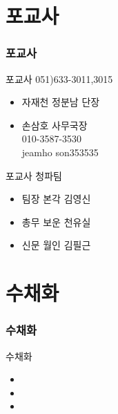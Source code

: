 \documentclass[aspectratio=1610,20pt,xcolor=pdftex,dvipsnames,table,handout]{beamer}
\begin{document}
		\section{포교사}
		\begin{frame} [t,plain]
		\frametitle{포교사}

			\begin{block} {포교사 051)633-3011,3015}
			\setlength{\leftmargini}{1em}			
			\begin{itemize}
				\item 자재천 정분남 단장 	\hrulefill
				\item 손삼호 사무국장 \\ 010-3587-3530 \\ jeamho son353535
			\end{itemize}
			\end{block}						


			\begin{block} {포교사 청파팀 }
			\setlength{\leftmargini}{1em}			
			\begin{itemize}
				\item 팀장 본각 김영신 	\hrulefill
				\item 총무 보운 천유실 	\hrulefill
				\item 신문 월인 김필근 	\hrulefill
			\end{itemize}
			\end{block}						

		\end{frame}					




		\section{수채화}
		\begin{frame} [t,plain]
		\frametitle{수채화}
			\begin{block} {수채화}
			\setlength{\leftmargini}{1em}			
			\begin{itemize}
				\item 	\hrulefill
				\item 	\hrulefill
				\item 	\hrulefill
			\end{itemize}
			\end{block}						
		\end{frame}					
\end{document}
